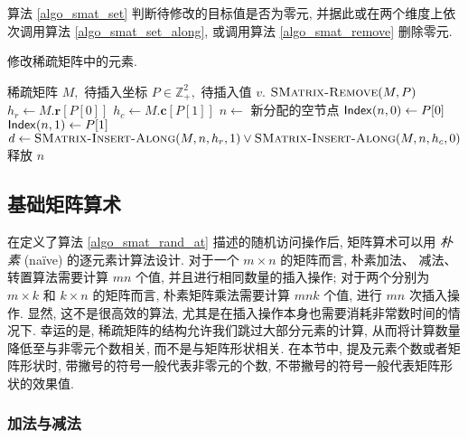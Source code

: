 算法 \ref{algo_smat_set} 判断待修改的目标值是否为零元, 并据此或在两个维度上依次调用算法 \ref{algo_smat_set_along}, 或调用算法 \ref{algo_smat_remove} 删除零元.
\begin{breakablealgorithm}
\caption{修改稀疏矩阵中的元素.}
\label{algo_smat_set}
\begin{algorithmic}[1]
\Require 稀疏矩阵 $M,$ 待插入坐标 $P \in \mathbb{Z}_{+}^{2},$ 待插入值 $v.$
        \State $\textsc{SMatrix-Remove}(M, P)$
        \State \Return
    \EndIf
    \State $h_r \gets M.\bm{r}[P[0]]$
    \State $h_c \gets M.\bm{c}[P[1]]$
    \State $n \gets$ 新分配的空节点
    \State $\mathsf{Index}(n, 0) \gets P[0]$
    \State $\mathsf{Index}(n, 1) \gets P[1]$
    \State $d \gets \textsc{SMatrix-Insert-Along}(M, n, h_r, 1) \lor \textsc{SMatrix-Insert-Along}(M, n, h_c, 0)$
        \State 释放 $n$
    \EndIf
\EndProcedure
\end{algorithmic}
\end{breakablealgorithm}

\subsection{基础矩阵算术}

在定义了算法 \ref{algo_smat_rand_at} 描述的随机访问操作后, 矩阵算术可以用 \textit{朴素} (na\"{i}ve) 的逐元素计算法设计. 对于一个 $m \times n$ 的矩阵而言, 朴素加法、 减法、 转置算法需要计算 $mn$ 个值, 并且进行相同数量的插入操作; 对于两个分别为 $m \times k$ 和 $k \times n$ 的矩阵而言, 朴素矩阵乘法需要计算 $mnk$ 个值, 进行 $mn$ 次插入操作. 显然, 这不是很高效的算法, 尤其是在插入操作本身也需要消耗非常数时间的情况下. 幸运的是, 稀疏矩阵的结构允许我们跳过大部分元素的计算, 从而将计算数量降低至与非零元个数相关, 而不是与矩阵形状相关. 在本节中, 提及元素个数或者矩阵形状时, 带撇号的符号一般代表非零元的个数, 不带撇号的符号一般代表矩阵形状的效果值.

\subsubsection{加法与减法}

